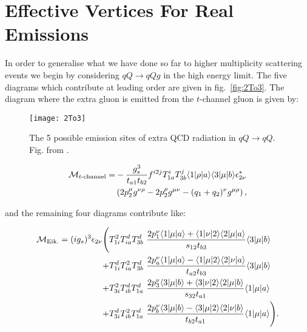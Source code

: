 	\section{Effective Vertices For Real Emissions}
		\label{sec:effectiveVertices}

		In order to generalise what we have done so far to higher multiplicity scattering events we begin
		by considering $qQ\rightarrow qQg$ in the high energy limit.  The five diagrams which contribute at
		leading order are given in fig.~\eqref{fig:2To3}.  The diagram
		where the extra gluon is emitted from the $t$-channel gluon is given by:

		\begin{figure}[hbt]
			\begin{center}
			\texttt{[image: 2To3]}
			\caption{The 5 possible emission sites of extra QCD radiation in $qQ\rightarrow qQ$.
			Fig. from \cite{Andersen:2009nu}.}
			\label{fig:2To3}
			\end{center}
		\end{figure}

		\begin{align}
		\begin{split}
			\mathcal{M}_{t\text{-channel}} = &-\frac{g_s^3}{t_{a1}t_{b2}}f^{i2j}T^i_{1a}T^j_{3b}\langle 1 | \rho | a \rangle\langle 3 | \mu | b \rangle
			\epsilon^*_{2\nu}\\&\left(2p_2^\mu g^{\nu\rho} - 2p_2^\rho g^{\mu\nu} - (q_1 + q_2)^\nu g^{\mu\rho} \right),
			\label{eqn:mtchannel}
		\end{split}
		\end{align}

		and the remaining four diagrams contribute like:

		\begin{align}
		\begin{split}
		    \mathcal{M}_{\text{Eik.}} = (ig_s)^3 \epsilon_{2\nu} \Bigg(
		     &T^2_{1i}T^d_{ia}T^d_{3b}\ \frac{2p_1^\nu\langle 1 | \mu | a \rangle + \langle 1 | \nu | 2 \rangle\langle 2 | \mu | a \rangle} {s_{12}t_{b3}} \langle 3 | \mu | b \rangle \\
		    +&T^d_{1i}T^2_{ia}T^d_{3b}\ \frac{2p_a^\nu\langle 1 | \mu | a \rangle - \langle 1 | \mu | 2 \rangle\langle 2 | \nu | a \rangle} {t_{a2}t_{b3}} \langle 3 | \mu | b \rangle \\
		    +&T^2_{3i}T^d_{ib}T^d_{1a}\ \frac{2p_3^\nu\langle 3 | \mu | b \rangle + \langle 3 | \nu | 2 \rangle\langle 2 | \mu | b \rangle} {s_{32}t_{a1}} \langle 1 | \mu | a \rangle\\
		    +&T^d_{3i}T^2_{ib}T^d_{1a}\ \frac{2p_b^\nu\langle 3 | \mu | b \rangle - \langle 3 | \mu | 2 \rangle\langle 2 | \nu | b \rangle} {t_{b2}t_{a1}} \langle 1 | \mu | a \rangle\Bigg).
			\label{eq:fulltree}
		\end{split}
		\end{align}

